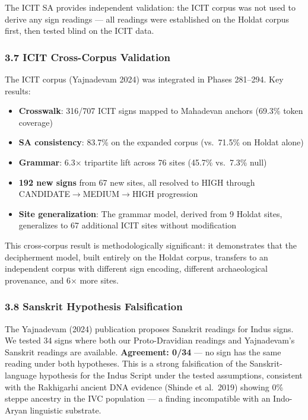 \documentclass[
  11pt,
]{article}
\providecommand{\tightlist}{%
  \setlength{\itemsep}{0pt}\setlength{\parskip}{0pt}}
\begin{document}
The ICIT SA provides independent validation: the ICIT corpus
was not used to derive any sign readings --- all readings were
established on the Holdat corpus first, then tested blind on the
ICIT data.

\subsubsection{3.7 ICIT Cross-Corpus
Validation}\label{yajnadevam-cross-corpus-validation}

The ICIT corpus (Yajnadevam 2024) was integrated in Phases
281--294. Key results:

\begin{itemize}
\tightlist
\item
  \textbf{Crosswalk}: 316/707 ICIT signs mapped to Mahadevan
  anchors (69.3\% token coverage)
\item
  \textbf{SA consistency}: 83.7\% on the expanded corpus (vs.~71.5\% on
  Holdat alone)
\item
  \textbf{Grammar}: 6.3× tripartite lift across 76 sites (45.7\%
  vs.~7.3\% null)
\item
  \textbf{192 new signs} from 67 new sites, all resolved to HIGH through
  CANDIDATE$\to$MEDIUM$\to$HIGH progression
\item
  \textbf{Site generalization}: The grammar model, derived from 9 Holdat
  sites, generalizes to 67 additional ICIT sites without
  modification
\end{itemize}

This cross-corpus result is methodologically significant: it
demonstrates that the decipherment model, built entirely on the Holdat
corpus, transfers to an independent corpus with different sign encoding,
different archaeological provenance, and 6× more sites.

\subsubsection{3.8 Sanskrit Hypothesis
Falsification}\label{sanskrit-hypothesis-falsification}

The Yajnadevam (2024) publication proposes Sanskrit readings for Indus
signs. We tested 34 signs where both our Proto-Dravidian readings and
Yajnadevam's Sanskrit readings are available. \textbf{Agreement: 0/34}
--- no sign has the same reading under both hypotheses. This is a strong
falsification of the Sanskrit-language hypothesis for the Indus Script
under the tested assumptions, consistent with the Rakhigarhi ancient DNA
evidence (Shinde et al.~2019) showing 0\% steppe ancestry in the IVC
population --- a finding incompatible with an Indo-Aryan linguistic
substrate.
\end{document}
